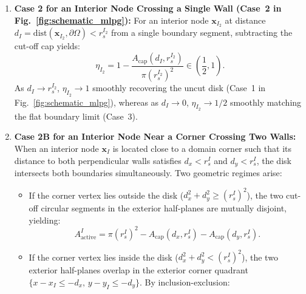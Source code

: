 \documentclass[VANCOUVER,Times1COL]{WileyNJD-v5}
\begin{document}
\begin{enumerate}
          \begin{equation}
              \eta_B(d_{\parallel}) = \frac{1}{2} \left( 1 - \frac{A_{\mathrm{cap}}(d_{\parallel}, r_s^B)}{\pi (r_s^B)^2} \right) \in \left[ \frac{1}{4}, \frac{1}{2} \right),
              \label{eq:eta_boundary_near_corner}
          \end{equation}
          with $A_{\mathrm{active}}^B = \eta_B(d_{\parallel}) \pi (r_s^B)^2$. Equation~\eqref{eq:eta_boundary_near_corner} provides a continuous, exact transition between the interior-wall half-disk ($\eta \to 1/2$ as $d_{\parallel} \to r_s^B$) and the corner vertex quarter-disk ($\eta \to 1/4$ as $d_{\parallel} \to 0$).
    \item \textbf{Case 2 for an Interior Node Crossing a Single Wall (Case~2 in Fig.~\ref{fig:schematic_mlpg}):} For an interior node $\mathbf{x}_{I_2}$ at distance $d_I = \mathrm{dist}(\mathbf{x}_{I_2}, \partial\Omega) < r_s^{I_2}$ from a single boundary segment, subtracting the cut-off cap yields:
          \begin{equation}
              \eta_{I_2} = 1 - \frac{A_{\mathrm{cap}}(d_I, r_s^{I_2})}{\pi (r_s^{I_2})^2} \in \left( \frac{1}{2}, 1 \right).
              \label{eq:eta_circular_cap}
          \end{equation}
          As $d_I \to r_s^{I_2}$, $\eta_{I_2} \to 1$ smoothly recovering the uncut disk (Case~1 in Fig.~\ref{fig:schematic_mlpg}), whereas as $d_I \to 0$, $\eta_{I_2} \to 1/2$ smoothly matching the flat boundary limit (Case~3).
    \item \textbf{Case 2B for an Interior Node Near a Corner Crossing Two Walls:} When an interior node $\mathbf{x}_I$ is located close to a domain corner such that its distance to both perpendicular walls satisfies $d_x < r_s^I$ and $d_y < r_s^I$, the disk intersects both boundaries simultaneously. Two geometric regimes arise:
          \begin{itemize}
              \item If the corner vertex lies outside the disk ($d_x^2 + d_y^2 \ge (r_s^I)^2$), the two cut-off circular segments in the exterior half-planes are mutually disjoint, yielding:
                    \begin{equation}
                        A_{\mathrm{active}}^I = \pi (r_s^I)^2 - A_{\mathrm{cap}}(d_x, r_s^I) - A_{\mathrm{cap}}(d_y, r_s^I).
                        \label{eq:eta_interior_corner_disjoint}
                    \end{equation}
              \item If the corner vertex lies inside the disk ($d_x^2 + d_y^2 < (r_s^I)^2$), the two exterior half-planes overlap in the exterior corner quadrant $\{x - x_I \le -d_x, \, y - y_I \le -d_y\}$. By inclusion-exclusion:

\end{itemize}
\end{enumerate}
\end{document}
